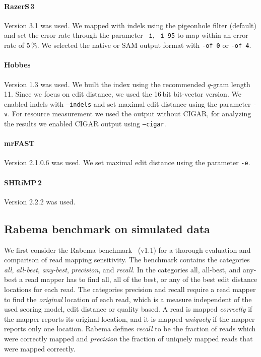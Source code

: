 \paragraph{RazerS\,3}
Version 3.1 was used.
We mapped with indels using the pigeonhole filter (default) and set the error rate through the parameter \texttt{-i}, \eg \texttt{-i 95} to map within an error rate of 5\,\%.
We selected the native or SAM output format with \texttt{-of 0} or \texttt{-of 4}.

\paragraph{Hobbes}
Version 1.3 was used.
We built the index using the recommended $q$-gram length 11.
Since we focus on edit distance, we used the 16\,bit bit-vector version.
We enabled indels with \texttt{--indels} and set maximal edit distance using the parameter \texttt{-v}.
For resource measurement we used the output without CIGAR, for analyzing the results we enabled CIGAR output using \texttt{--cigar}.

\paragraph{mrFAST}
Version 2.1.0.6 was used.
We set maximal edit distance using the parameter \texttt{-e}.

\paragraph{SHRiMP\,2}
Version 2.2.2 was used.

\subsection{Rabema benchmark on simulated data}

We first consider the Rabema benchmark~\citep{Holtgrewe2011} (v1.1) for a thorough evaluation and comparison of read mapping sensitivity.
The benchmark contains the categories \emph{all}, \emph{all-best}, \emph{any-best}, \emph{precision}, and \emph{recall}.
In the categories all, all-best, and any-best a read mapper has to find all, all of the best, or any of the best edit distance locations for each read.
The categories precision and recall require a read mapper to find the \emph{original} location of each read, which is a measure independent of the used scoring model, \eg edit distance or quality based.
A read is mapped \emph{correctly} if the mapper reports its original location, 
and it is mapped \emph{uniquely} if the mapper reports only one location.
Rabema defines \emph{recall} to be the fraction of reads which were correctly mapped and \emph{precision} the fraction of uniquely mapped reads that were mapped correctly.

